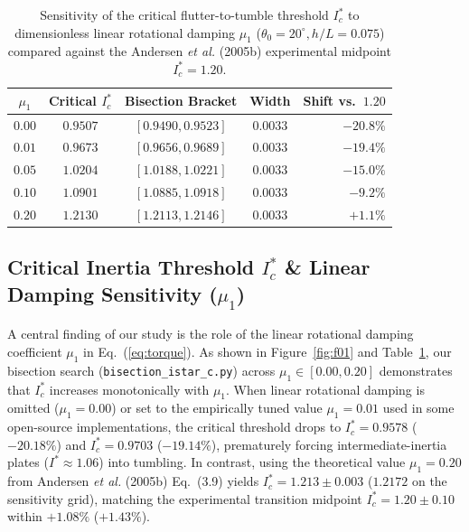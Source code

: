 \documentclass[10pt,a4paper,twocolumn]{article}
\begin{document}
\begin{table}[t]
\centering
\caption{Sensitivity of the critical flutter-to-tumble threshold $I^*_c$ to dimensionless linear rotational damping $\mu_1$ ($\theta_0 = 20^\circ, h/L = 0.075$) compared against the Andersen \textit{et al.} (2005b) experimental midpoint $I^*_c = 1.20$.}
\label{tab:mu1}
\footnotesize
\begin{tabular}{ccccr}
\toprule
$\mu_1$ & Critical $I^*_c$ & Bisection Bracket & Width & Shift vs.\ $1.20$ \\
\midrule
$0.00$ & $\mathbf{0.9507}$ & $[0.9490, 0.9523]$ & $0.0033$ & $-20.8\%$ \\
$0.01$ & $\mathbf{0.9673}$ & $[0.9656, 0.9689]$ & $0.0033$ & $-19.4\%$ \\
$0.05$ & $\mathbf{1.0204}$ & $[1.0188, 1.0221]$ & $0.0033$ & $-15.0\%$ \\
$0.10$ & $\mathbf{1.0901}$ & $[1.0885, 1.0918]$ & $0.0033$ & $-9.2\%$ \\
$0.20$ & $\mathbf{1.2130}$ & $[1.2113, 1.2146]$ & $0.0033$ & $\mathbf{+1.1\%}$ \\
\bottomrule
\end{tabular}
\end{table}

\subsection{Critical Inertia Threshold $I^*_c$ \& Linear Damping Sensitivity ($\mu_1$)}
A central finding of our study is the role of the linear rotational damping coefficient $\mu_1$ in Eq.~(\ref{eq:torque}). As shown in Figure~\ref{fig:f01} and Table~\ref{tab:mu1}, our bisection search (\texttt{bisection\_istar\_c.py}) across $\mu_1 \in [0.00, 0.20]$ demonstrates that $I^*_c$ increases monotonically with $\mu_1$. When linear rotational damping is omitted ($\mu_1 = 0.00$) or set to the empirically tuned value $\mu_1 = 0.01$ used in some open-source implementations, the critical threshold drops to $I^*_c = 0.9578$ ($-20.18\%$) and $I^*_c = 0.9703$ ($-19.14\%$), prematurely forcing intermediate-inertia plates ($I^* \approx 1.06$) into tumbling. In contrast, using the theoretical value $\mu_1 = 0.20$ from Andersen \textit{et al.} (2005b) Eq.~(3.9) yields $I^*_c = 1.213 \pm 0.003$ ($1.2172$ on the sensitivity grid), matching the experimental transition midpoint $I^*_c = 1.20 \pm 0.10$ within $+1.08\%$ ($+1.43\%$).
\end{document}
